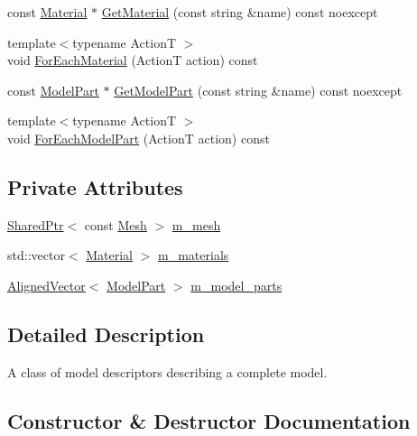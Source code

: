 \begin{DoxyCompactItemize}
\item 
const \hyperlink{classmage_1_1_material}{Material} $\ast$ \hyperlink{classmage_1_1_model_descriptor_adc013e6b054c7efa0d92a3ad1ff37e61}{Get\+Material} (const string \&name) const noexcept
\item 
{\footnotesize template$<$typename ActionT $>$ }\\void \hyperlink{classmage_1_1_model_descriptor_ac4723e18238b0d6ac3c54168b8e9a09f}{For\+Each\+Material} (ActionT action) const
\item 
const \hyperlink{structmage_1_1_model_part}{Model\+Part} $\ast$ \hyperlink{classmage_1_1_model_descriptor_a9c8e98d71883edd33b9d6c1964e7bf36}{Get\+Model\+Part} (const string \&name) const noexcept
\item 
{\footnotesize template$<$typename ActionT $>$ }\\void \hyperlink{classmage_1_1_model_descriptor_a1d61699788385cf29726fac0067bcb5c}{For\+Each\+Model\+Part} (ActionT action) const
\end{DoxyCompactItemize}
\subsection*{Private Attributes}
\begin{DoxyCompactItemize}
\item 
\hyperlink{namespacemage_a1e01ae66713838a7a67d30e44c67703e}{Shared\+Ptr}$<$ const \hyperlink{classmage_1_1_mesh}{Mesh} $>$ \hyperlink{classmage_1_1_model_descriptor_a675b02d184e775c03c05006f8fa9aeb4}{m\+\_\+mesh}
\item 
std\+::vector$<$ \hyperlink{classmage_1_1_material}{Material} $>$ \hyperlink{classmage_1_1_model_descriptor_a4932961cdc073375135a33bf85e2ccf2}{m\+\_\+materials}
\item 
\hyperlink{namespacemage_a8664bfb5ce2179fc64eae9f82c8a5ba8}{Aligned\+Vector}$<$ \hyperlink{structmage_1_1_model_part}{Model\+Part} $>$ \hyperlink{classmage_1_1_model_descriptor_a5b24f94509a05fc88ca62a4c0536bf7c}{m\+\_\+model\+\_\+parts}
\end{DoxyCompactItemize}


\subsection{Detailed Description}
A class of model descriptors describing a complete model. 

\subsection{Constructor \& Destructor Documentation}
\hypertarget{classmage_1_1_model_descriptor_aaf8468659b744b029505ff3024fc633d}{}\label{classmage_1_1_model_descriptor_aaf8468659b744b029505ff3024fc633d} 
